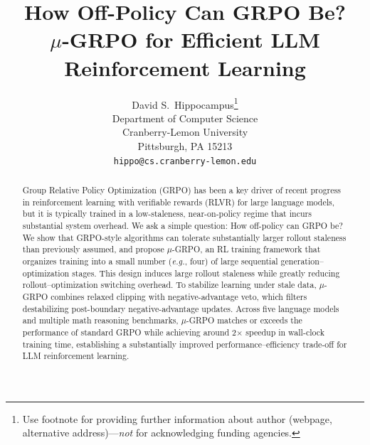 \documentclass{article}
\title{How Off-Policy Can GRPO Be? \\ \boldmath $\mu$-GRPO for Efficient LLM Reinforcement Learning}
\author{%
  David S.~Hippocampus\thanks{Use footnote for providing further information
    about author (webpage, alternative address)---\emph{not} for acknowledging
    funding agencies.} \\
  Department of Computer Science\\
  Cranberry-Lemon University\\
  Pittsburgh, PA 15213 \\
  \texttt{hippo@cs.cranberry-lemon.edu} \\
}
\begin{document}
\maketitle


\begin{abstract}
Group Relative Policy Optimization (GRPO) has been a key driver of recent progress in reinforcement learning with verifiable rewards (RLVR) for large language models, but it is typically trained in a low-staleness, near-on-policy regime that incurs substantial system overhead. We ask a simple question: How off-policy can GRPO be? We show that GRPO-style algorithms can tolerate substantially larger rollout staleness than previously assumed, and propose $\mu$-GRPO, an RL training framework that organizes training into a small number (\textit{e.g.}, four) of
large sequential generation--optimization stages. This design induces large rollout staleness while greatly reducing rollout--optimization switching
overhead. To stabilize learning under stale data, $\mu$-GRPO combines relaxed clipping with negative-advantage veto, which filters destabilizing post-boundary negative-advantage updates. Across five language models and multiple math reasoning benchmarks, $\mu$-GRPO matches or exceeds the performance of standard GRPO while achieving around 2$\times$ speedup in wall-clock training time, establishing a substantially improved performance–efficiency trade-off for LLM reinforcement learning.
\end{abstract}


















 
 
\appendix
\onecolumn








\newpage

\end{document}
